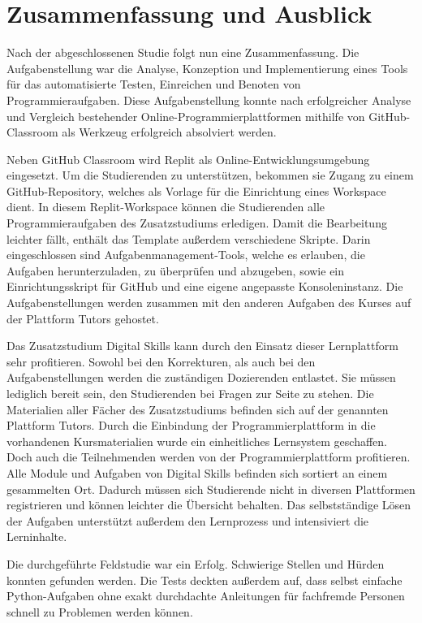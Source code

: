\section{Zusammenfassung und Ausblick}\label{zusammenfassung-u-ausblick}
Nach der abgeschlossenen Studie folgt nun eine Zusammenfassung. Die
Aufgabenstellung war die Analyse, Konzeption und Implementierung eines Tools
für das automatisierte Testen, Einreichen und Benoten von Programmieraufgaben.
Diese Aufgabenstellung konnte nach erfolgreicher Analyse und Vergleich
bestehender Online-Programmierplattformen mithilfe von GitHub-Classroom als
Werkzeug erfolgreich absolviert werden.

Neben GitHub Classroom wird Replit als Online-Entwicklungsumgebung eingesetzt.
Um die Studierenden zu unterstützen, bekommen sie Zugang zu einem
GitHub-Repository, welches als Vorlage für die Einrichtung eines Workspace
dient. In diesem Replit-Workspace können die Studierenden alle
Programmieraufgaben des Zusatzstudiums erledigen. Damit die Bearbeitung leichter
fällt, enthält das Template außerdem verschiedene Skripte. Darin eingeschlossen
sind Aufgabenmanagement-Tools, welche es erlauben, die Aufgaben herunterzuladen,
zu überprüfen und abzugeben, sowie ein Einrichtungsskript für GitHub und eine
eigene angepasste Konsoleninstanz. Die Aufgabenstellungen werden zusammen mit
den anderen Aufgaben des Kurses auf der Plattform Tutors gehostet.

Das Zusatzstudium Digital Skills kann durch den Einsatz dieser
Lernplattform sehr profitieren. Sowohl bei den Korrekturen, als auch bei den 
Aufgabenstellungen werden die zuständigen Dozierenden entlastet. Sie müssen
lediglich bereit sein, den Studierenden bei Fragen zur Seite zu stehen. Die
Materialien aller Fächer des Zusatzstudiums befinden sich auf der genannten
Plattform Tutors. Durch die Einbindung der Programmierplattform in die
vorhandenen Kursmaterialien wurde ein einheitliches Lernsystem geschaffen. Doch
auch die Teilnehmenden werden von der Programmierplattform profitieren. Alle
Module und Aufgaben von Digital Skills befinden sich sortiert an einem
gesammelten Ort. Dadurch müssen sich Studierende nicht in diversen Plattformen 
registrieren und können leichter die Übersicht behalten. Das selbstständige
Lösen der Aufgaben unterstützt außerdem den Lernprozess und intensiviert die
Lerninhalte.

Die durchgeführte Feldstudie war ein Erfolg. Schwierige Stellen und Hürden
konnten gefunden werden. Die Tests deckten außerdem auf, dass selbst einfache
Python-Aufgaben ohne exakt durchdachte Anleitungen für fachfremde Personen
schnell zu Problemen werden können.

